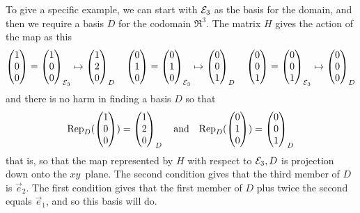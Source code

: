 \begin{exercises}
\begin{answer}
\begin{exparts}
            To give a specific example, we can 
            start with $\stdbasis_3$ as the basis for the domain, and then
            we require a basis $D$ for the codomain $\Re^3$.
            The matrix $H$ gives the action of the map as this
            \begin{equation*}
              \colvec{1 \\ 0 \\ 0}=\colvec{1 \\ 0 \\ 0}_{\stdbasis_3}
                 \mapsto\colvec{1 \\ 2 \\ 0}_D
              \quad       
              \colvec{0 \\ 1 \\ 0}=\colvec{0 \\ 1 \\ 0}_{\stdbasis_3}
                 \mapsto\colvec{0 \\ 0 \\ 1}_D
              \quad       
              \colvec{0 \\ 0 \\ 1}=\colvec{0 \\ 0 \\ 1}_{\stdbasis_3}
                 \mapsto\colvec{0 \\ 0 \\ 0}_D
            \end{equation*}
            and there is no harm in finding a basis $D$ so that
            \begin{equation*}
              \rep{\colvec{1 \\ 0 \\ 0}}{D}=\colvec{1 \\ 2 \\ 0}_D
              \quad\mbox{and}\quad       
              \rep{\colvec{0 \\ 1 \\ 0}}{D}=\colvec{0 \\ 0 \\ 1}_D
            \end{equation*}
            that is, so that the map represented by $H$ with respect to
            $\stdbasis_3,D$ is projection down onto the $xy$~plane.
            The second condition gives that the third member of $D$
            is $\vec{e}_2$.
            The first condition gives that the first member of $D$ plus twice
            the second equals $\vec{e}_1$, and so this basis will do.
            \begin{equation*}

\end{equation*}
\end{exparts}
\end{answer}
\end{exercises}
